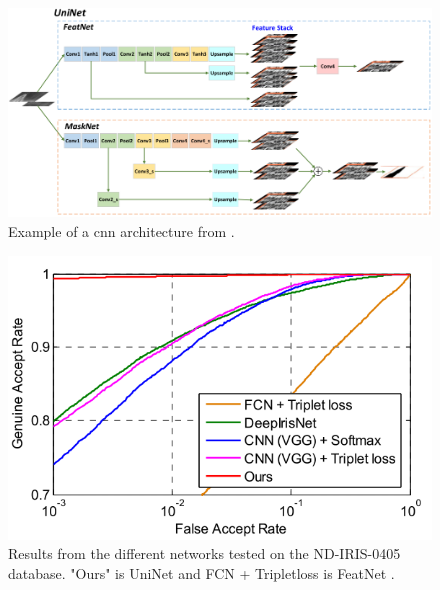 \begin{figure}[H]
\centering
\includegraphics[width=\textwidth]{figures/Zhao2017_CNN_model} 
\caption{Example of a \gls{cnn} architecture  from \cite{Zhao2017a}.}
\label{fig:Zhao2017_CNN_model}
\end{figure}

\begin{figure}[H]
\centering
\includegraphics[width=\textwidth]{figures/Zhao2017_CNN_results} 
\caption{Results from the different networks tested on the ND-IRIS-0405 database. "Ours" is UniNet and FCN + Tripletloss is FeatNet \citep{Zhao2017a}.}
\label{fig:Zhao2017_CNN_results}
\end{figure}


